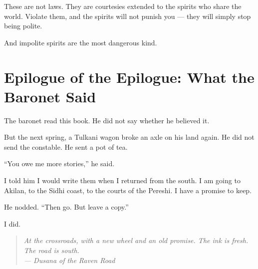 \documentclass[10pt,twoside]{book}
\newcommand{\dusana}[1]{\begin{quote}\itshape #1 \\ --- Dusana of the Raven Road\end{quote}}
\begin{document}
These are not laws. They are courtesies extended to the spirits who share the world. Violate them, and the spirits will not punish you --- they will simply stop being polite.

And impolite spirits are the most dangerous kind.

\chapter*{Epilogue of the Epilogue: What the Baronet Said}

The baronet read this book. He did not say whether he believed it.

But the next spring, a Tulkani wagon broke an axle on his land again. He did not send the constable. He sent a pot of tea.

``You owe me more stories,'' he said.

I told him I would write them when I returned from the south. I am going to Akilan, to the Sidhi coast, to the courts of the Pereshi. I have a promise to keep.

He nodded. ``Then go. But leave a copy.''

I did.

\dusana{At the crossroads, with a new wheel and an old promise. The ink is fresh. The road is south.}
\end{document}
